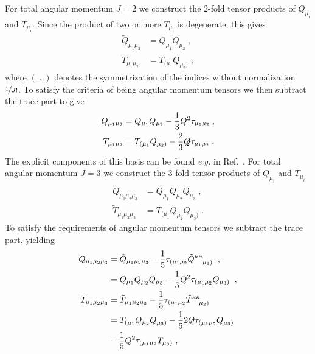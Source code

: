 %
%
%
%
%
For total angular momentum $J=2$ we construct the $2$-fold tensor products of $Q_{\mu_i}$ and 
$T_{\mu_i}$. Since the product of two or more $T_{\mu_i}$ is degenerate, this gives 
%
\begin{align}
  \tilde{Q}_{\mu_1\mu_2} &= Q_{\mu_1}Q_{\mu_2} \; , \\
  \tilde{T}_{\mu_1\mu_2} &=T_{(\mu_1}Q_{\mu_2)} \;,%
\end{align}
%
where ${(\ldots)}$ denotes the symmetrization of the indices without normalization 
$\nicefrac{1}{J!}$.
%
To satisfy the criteria of being angular momentum tensors we then subtract the trace-part to give~\cite{LlewellynSmith:1969az,Krassnigg:2010mh}
%
\begin{align}
  Q_{\mu_1\mu_2} &= Q_{\mu_1} Q_{\mu_2} - \frac{1}{3}Q^2 \tau_{\mu_1\mu_2} \;, \\
  T_{\mu_1\mu_2} &= T_{(\mu_1} Q_{\mu_2)} -\frac{2}{3} \mkern-4mu \not \mkern-6mu Q\tau_{\mu_1\mu_2}\;.
\end{align}
The explicit components of this basis can be found {\it e.g.} in Ref.~\cite{Krassnigg:2010mh}.
%
%
For total angular momentum $J=3$ we construct the $3$-fold tensor products of $Q_{\mu_i}$ and 
$T_{\mu_i}$
%
\begin{align}
  \tilde{Q}_{\mu_1\mu_2\mu_3} &= Q_{\mu_1}Q_{\mu_2}Q_{\mu_3} \; , \\
  \tilde{T}_{\mu_1\mu_2\mu_3} &= T_{(\mu_1}Q_{\mu_2}Q_{\mu_3)}\;.
\end{align}
%
To satisfy the requirements of angular momentum tensors we subtract the trace part, yielding
%
\begin{align}
  Q_{\mu_1\mu_2\mu_3} &= \tilde{Q}_{\mu_1\mu_2\mu_3} - \frac{1}{5} 
   \tau_{(\mu_1\mu_2}\tilde{Q}^{\kappa\kappa}_{\phantom{\kappa\kappa}\mu_3)}  \;\; , \nonumber\\
  &= Q_{\mu_1}Q_{\mu_2}Q_{\mu_3} - \frac{ 1 }{5}Q^2 
   \tau_{(\mu_1\mu_2} Q_{\mu_3)} \; \;, \\
  T_{\mu_1\mu_2\mu_3} &=\tilde{T}_{\mu_1\mu_2\mu_3} -\frac{1}{5} 
   \tau_{(\mu_1\mu_2}\tilde{T}^{\kappa\kappa}_{\phantom{\kappa\kappa}\mu_3)}  \nonumber \\
  &= T_{(\mu_1}Q_{\mu_2} Q_{\mu_3)} - \frac{1}{5} 
   2\mkern-4mu \not \mkern-6mu Q\tau_{(\mu_1\mu_2}Q_{\mu_3)}  \nonumber \\
   & - \frac{1}{5} Q^2\tau_{(\mu_1\mu_2} T_{\mu_3)}   \;,
\end{align}
